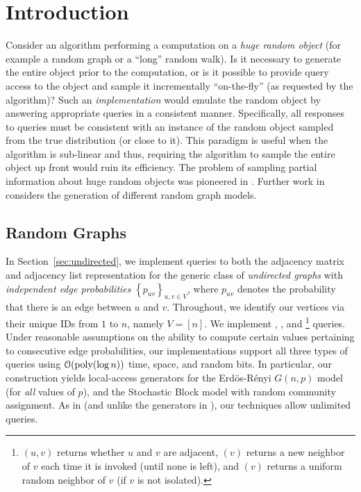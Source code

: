 \section{Introduction}
Consider an algorithm performing a computation on a \emph{huge random object} (for example a random graph or a ``long'' random walk).
Is it necessary to generate the entire object prior to the computation,
or is it possible to provide query access to the object and sample it incrementally ``on-the-fly'' (as requested by the algorithm)?
Such an \emph{implementation} would emulate the random object by answering appropriate queries in a consistent manner.
Specifically, all responses to queries must be consistent with an instance of the random object sampled from the true distribution (or close to it).
This paradigm is useful when the algorithm is sub-linear and thus,
requiring the algorithm to sample the entire object up front would ruin its efficiency.
The problem of sampling partial information about huge random objects was pioneered in \cite{huge_old,huge}.
Further work in \cite{sparse,reut} considers the generation of different random graph models.




\subsection{Random Graphs}%
\label{sec:random_graphs}
In Section~\ref{sec:undirected}, we implement queries to both the adjacency matrix and adjacency list representation
for the generic class of \emph{undirected graphs} with {\em independent edge probabilities} $\left\{ p_{uv} \right\}_{u,v\in V}$,
where $p_{uv}$ denotes the probability that there is an edge between $u$ and $v$.
Throughout, we identify our vertices via their unique IDs from $1$ to $n$, namely $V = [n]$.
We implement , , and 
\footnote{$(u,v)$ returns whether $u$ and $v$ are adjacent, $(v)$ returns a new neighbor of $v$ each time
it is invoked (until none is left), and $(v)$ returns a uniform random neighbor of $v$ (if $v$ is not isolated).} queries.
Under reasonable assumptions on the ability to compute certain values pertaining to consecutive edge probabilities,
our implementations support all three types of queries using $\mathcal{O}(\mathrm{poly}(\log n))$ time, space, and random bits.
In particular, our construction yields local-access generators for the Erd\"{o}s-R\'{e}nyi $G(n,p)$ model (for \emph{all} values of $p$),
and the Stochastic Block model with random community assignment.
As in \cite{reut} (and unlike the generators in \cite{huge_old,huge,sparse}), our techniques allow unlimited queries.

